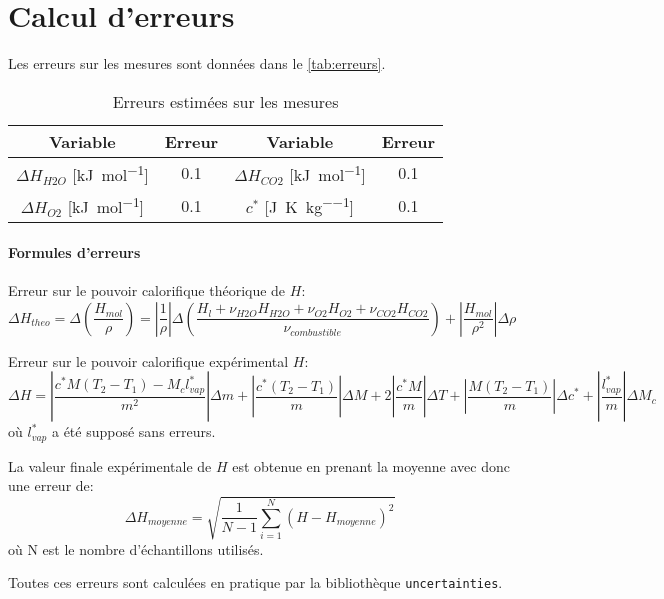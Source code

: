 \section{Calcul d'erreurs}
\label{sec:erreurs}

Les erreurs sur les mesures sont données dans le \autoref{tab:erreurs}.

\begin{table}[h]
    \centering
    \begin{tabulary}{\textwidth}{C C|C C}
        \toprule
        Variable & Erreur & Variable & Erreur \\
        \midrule
        \(\Delta H_{H2O}\) [\si{\kilo\joule\per\mole}] & 0.1 & \(\Delta H_{CO2}\) [\si{\kilo\joule\per\mole}] & 0.1 \\
        \(\Delta H_{O2}\) [\si{\kilo\joule\per\mole}] & 0.1 & \(c^*\) [\si{\joule\per\kelvin\per\kilo\gram}] & 0.1 \\
        \bottomrule
    \end{tabulary}
    \caption{Erreurs estimées sur les mesures}
    \label{tab:erreurs}
\end{table}


\paragraph*{Formules d'erreurs}

Erreur sur le pouvoir calorifique théorique de \(H\):
\begin{equation}
    \Delta H_{theo} = \Delta(\frac{H_{mol}}{\rho}) = \left|\frac{1}{\rho}\right| \Delta \left(\frac{H_{l} + \nu_{H2O} H_{H2O} + \nu_{O2} H_{O2} + \nu_{CO2} H_{CO2}}{\nu_{combustible}}\right) + \left|\frac{H_{mol}}{\rho^2}\right| \Delta\rho
\end{equation}

Erreur sur le pouvoir calorifique expérimental \(H\):
\begin{equation}
    \Delta H = \left|\frac{c^* M (T_2 - T_1) - M_c l^*_{vap}}{m^2}\right| \Delta m + \left|\frac{c^* (T_2 - T_1)}{m}\right| \Delta M + 2 \left|\frac{c^* M}{m}\right| \Delta T + \left|\frac{M (T_2 - T_1)}{m}\right| \Delta c^* + \left|\frac{l^*_{vap}}{m}\right| \Delta M_c
\end{equation}
où \(l^*_{vap}\) a été supposé sans erreurs.

La valeur finale expérimentale de \(H\) est obtenue en prenant la moyenne avec donc une erreur de:
\begin{equation}
    \Delta H_{moyenne} = \sqrt{\frac{1}{N - 1}\sum_{i=1}^{N}(H - H_{moyenne})^2}
\end{equation}
où N est le nombre d'échantillons utilisés.

Toutes ces erreurs sont calculées en pratique par la bibliothèque \texttt{uncertainties}.
